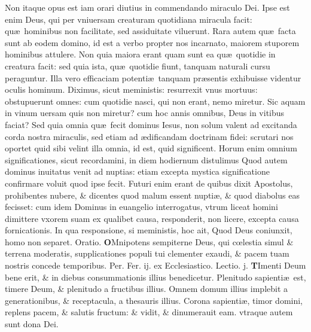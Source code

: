 \documentclass[a5paper,10pt]{book}
\def\leftmarginnote{%
	\lrmarginnote{\hskip -\marginparsep \hskip -6.5em}}
\def\ae{æ}
\def\oe{œ}
\begin{document}
\begin{multicols*}{2}
Non itaque opus est iam orari diutius in commendando miraculo Dei. Ipse est enim Deus, qui per vniuersam creaturam quotidiana miracula facit: qu\ae \ hominibus non facilitate, sed assiduitate viluerunt.
Rara autem qu\ae \ facta sunt ab eodem domino, id est a verbo propter nos incarnato, maiorem stuporem hominibus attulere.
Non quia maiora erant quam sunt ea qu\ae \ quotidie in creatura facit: sed quia ista, qu\ae \ quotidie fiunt, tanquam naturali cursu peraguntur.
Illa vero efficaciam potenti\ae \ tanquam pr\ae sentis exhibuisse videntur oculis hominum.
Diximus, sicut meministis: resurrexit vnus mortuus: obstupuerunt omnes: cum quotidie nasci, qui non erant, nemo miretur.
Sic aquam in vinum uersam quis non miretur? cum hoc annis omnibus, Deus in vitibus faciat? Sed quia omnia qu\ae \ fecit dominus Iesus, non solum valent ad excitanda corda nostra miraculis, sed etiam ad \ae dificandam doctrinam fidei: scrutari nos oportet quid sibi velint illa omnia, id est, quid significent.
Horum enim omnium significationes, sicut recordamini, in diem hodiernum distulimus Quod autem dominus inuitatus venit ad nuptias: etiam excepta mystica significatione confirmare voluit quod ipse fecit.
Futuri enim erant de quibus dixit Apostolus, prohibentes nubere, \& dicentes quod malum essent nupti\ae , \& quod diabolus eas fecisset: cum idem Dominus in euangelio interrogatus, vtrum liceat homini dimittere vxorem suam ex qualibet causa, responderit, non licere, excepta causa fornicationis.
In qua responsione, si meministis, hoc ait, Quod Deus coniunxit, homo non separet. \color{red} Oratio. \color{black}
\vspace{-.25em}
\lettrine[lines=2]{\bfseries \color{red} O}{}Mnipotens sempiterne Deus, qui c\oe lestia simul \& terrena moderatis, supplicationes populi tui clementer exaudi, \& pacem tuam nostris concede temporibus. Per.
\newline {} \color{red} \hypertarget{MON-PRIMA-VAGAN}{Fer. ij.} ex Ecclesiastico. Lectio. j. \color{black}
\vspace{-.25em}
\lettrine[lines=2]{\bfseries T}{}Imenti\leftmarginnote{\begin{flushright}ca. 1.\end{flushright}} Deum bene erit, \& in diebus consummationis illius benedicetur.
Plenitudo sapienti\ae \ est, timere Deum, \& plenitudo a fructibus illius.
Omnem domum illius implebit a generationibus, \& receptacula, a thesauris illius. Corona sapienti\ae , timor domini, replens pacem, \& salutis fructum: \& vidit, \& dinumerauit eam. vtraque autem sunt dona Dei.

\end{multicols*}
\end{document}
